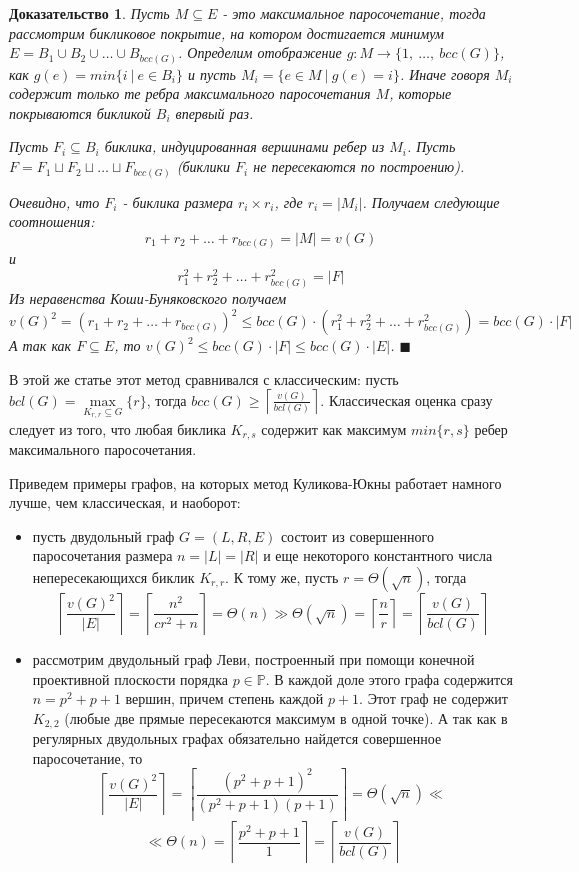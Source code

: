 \documentclass[a4paper]{article}
\newtheorem*{msolution}{Доказательство}
\begin{document}
\begin{msolution}
	Пусть $M\subseteq E$ - это максимальное паросочетание, тогда рассмотрим бикликовое покрытие, 
	на котором достигается минимум $E = B_1\cup B_2\cup \ldots \cup B_{bcc(G)}$. Определим 
	отображение $g:M\rightarrow \{1,\ \ldots,\ bcc(G)\}$, как $g(e) = min\{i\ |\ e\in B_i\}$ и пусть 
	$M_i = \{e\in M\ |\ g(e) = i\}$. Иначе говоря $M_i$ содержит только те ребра максимального 
	паросочетания $M$, которые покрываются бикликой $B_i$ впервый раз.
	
	Пусть $F_i \subseteq B_i$ биклика, индуцированная вершинами ребер из $M_i$. Пусть 
	$F = F_1\sqcup F_2\sqcup \ldots \sqcup F_{bcc(G)}$ (биклики $F_i$ не пересекаются по построению).
	
	Очевидно, что $F_i$ - биклика размера $r_i\times r_i$, где $r_i = |M_i|$. Получаем следующие 
	соотношения: $$r_1 + r_2 + \ldots + r_{bcc(G)} = |M| = v(G)$$ и 
	$$r_1^2 + r_2^2 + \ldots + r_{bcc(G)}^2 = |F|$$ Из неравенства Коши-Буняковского получаем 
	$$v(G)^2 = (r_1 + r_2 + \ldots + r_{bcc(G)})^2 \leq bcc(G)\cdot (r_1^2 + r_2^2 + \ldots + r_{bcc(G)}^2) = bcc(G)\cdot |F|$$
	А так как $F \subseteq E$, то $v(G)^2\leq bcc(G)\cdot |F| \leq bcc(G)\cdot |E|$. 
	$\blacksquare$
\end{msolution}

В этой же статье \cite{KulikovJukna} этот метод сравнивался с классическим: пусть $bcl(G) = \max\limits_{K_{r,r}\subseteq G}\{r\}$, 
тогда $bcc(G) \geq \left\lceil\frac{v(G)}{bcl(G)}\right\rceil$. Классическая оценка сразу следует из 
того, что любая биклика $K_{r, s}$ содержит как максимум $min\{r, s\}$ ребер максимального паросочетания.

Приведем примеры графов, на которых метод Куликова-Юкны работает намного лучше, чем классическая, и наоборот:

\begin{itemize}
    \item пусть двудольный граф $G = (L, R, E)$ состоит из совершенного паросочетания размера 
    $n = |L| = |R|$ и еще некоторого константного числа непересекающихся биклик $K_{r,r}$. 
    К тому же, пусть $r = \Theta(\sqrt{n})$, тогда $$\left\lceil\frac{v(G)^2}{|E|}\right\rceil = 
    \left\lceil\frac{n^2}{cr^2 + n}\right\rceil = \Theta(n) \gg \Theta(\sqrt{n}) = \left\lceil\frac{n}{r}\right\rceil = 
    \left\lceil\frac{v(G)}{bcl(G)}\right\rceil$$ 
    \item рассмотрим двудольный граф Леви, построенный при помощи конечной проективной плоскости порядка 
    $p\in \mathbb{P}$. В каждой доле этого графа содержится $n = p^2 + p + 1$ вершин, причем степень 
    каждой $p+1$. Этот граф не содержит $K_{2,2}$ (любые две прямые пересекаются максимум в одной точке). 
    А так как в регулярных двудольных графах обязательно найдется совершенное паросочетание, то 
    $$\left\lceil\frac{v(G)^2}{|E|}\right\rceil = \left\lceil\frac{(p^2 + p + 1)^2}{(p^2+p+1)(p+1)}\right\rceil = 
    \Theta(\sqrt{n}) \ll$$ $$\ll \Theta(n) = \left\lceil\frac{p^2 + p + 1}{1}\right\rceil = \left\lceil\frac{v(G)}{bcl(G)}\right\rceil$$
\end{itemize}
\end{document}
